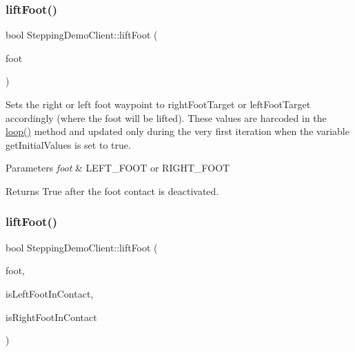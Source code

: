 \subsubsection{\texorpdfstring{lift\+Foot()}{liftFoot()}\hspace{0.1cm}{\footnotesize\ttfamily [1/2]}}
{\footnotesize\ttfamily bool Stepping\+Demo\+Client\+::lift\+Foot (\begin{DoxyParamCaption}\item[{\hyperlink{SteppingDemoClient_8h_ab0673d7f17cdd57b8fa124abb330287f}{F\+O\+O\+T\+\_\+\+C\+O\+N\+T\+A\+C\+TS}}]{foot }\end{DoxyParamCaption})\hspace{0.3cm}{\ttfamily [private]}}

Sets the right or left foot waypoint to right\+Foot\+Target or left\+Foot\+Target accordingly (where the foot will be lifted). These values are harcoded in the \hyperlink{classSteppingDemoClient_a37dba4764b5849cf33c395cd0d4b0eb5}{loop()} method and updated only during the very first iteration when the variable get\+Initial\+Values is set to true.


\begin{DoxyParams}{Parameters}
{\em foot} & L\+E\+F\+T\+\_\+\+F\+O\+OT or R\+I\+G\+H\+T\+\_\+\+F\+O\+OT\\
\hline
\end{DoxyParams}
\begin{DoxyReturn}{Returns}
True after the foot contact is deactivated. 
\end{DoxyReturn}
\hypertarget{classSteppingDemoClient_ae406e5c8f755f234272b63de4d6a774f}{}\label{classSteppingDemoClient_ae406e5c8f755f234272b63de4d6a774f} 
\subsubsection{\texorpdfstring{lift\+Foot()}{liftFoot()}\hspace{0.1cm}{\footnotesize\ttfamily [2/2]}}
{\footnotesize\ttfamily bool Stepping\+Demo\+Client\+::lift\+Foot (\begin{DoxyParamCaption}\item[{\hyperlink{SteppingDemoClient_8h_ab0673d7f17cdd57b8fa124abb330287f}{F\+O\+O\+T\+\_\+\+C\+O\+N\+T\+A\+C\+TS}}]{foot,  }\item[{bool}]{is\+Left\+Foot\+In\+Contact,  }\item[{bool}]{is\+Right\+Foot\+In\+Contact }\end{DoxyParamCaption})\hspace{0.3cm}{\ttfamily [private]}}


